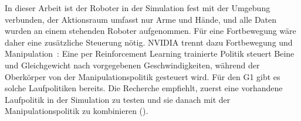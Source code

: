 In dieser Arbeit ist der Roboter in der Simulation fest mit der Umgebung
verbunden, der Aktionsraum umfasst nur Arme und Hände, und alle Daten wurden
an einem stehenden Roboter aufgenommen. Für eine Fortbewegung wäre daher eine
zusätzliche Steuerung nötig. NVIDIA trennt dazu Fortbewegung und
Manipulation~\cite{groot2025}: Eine per Reinforcement Learning trainierte
Politik steuert Beine und Gleichgewicht nach vorgegebenen Geschwindigkeiten,
während der Oberkörper von der Manipulationspolitik gesteuert wird. Für den G1
gibt es solche Laufpolitiken bereits. Die Recherche empfiehlt, zuerst eine
vorhandene Laufpolitik in der Simulation zu testen und sie danach mit der
Manipulationspolitik zu kombinieren ().

